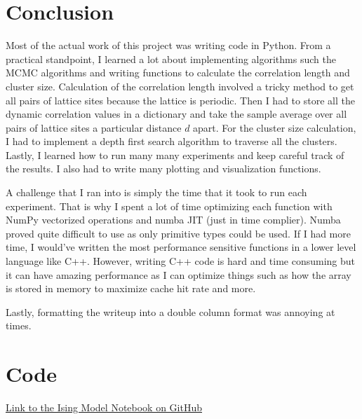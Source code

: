 \documentclass{article}
\begin{document}
\section{Conclusion}
Most of the actual work of this project was writing code in Python. From a practical standpoint, I learned a lot about implementing algorithms such
the MCMC algorithms and writing functions to calculate the correlation length and cluster size. Calculation of the correlation length involved a tricky
method to get all pairs of lattice sites because the lattice is periodic. Then I had to store all the dynamic correlation values in a dictionary and take the sample
average over all pairs of lattice sites a particular distance $d$ apart. For the cluster size calculation, I had to implement a depth first search algorithm
to traverse all the clusters. Lastly, I learned how to run many many experiments and keep careful track of the results. I also had to write many plotting 
and visualization functions. 

A challenge that I ran into is simply the time that it took to run each experiment. That is why I spent a lot of time optimizing each function with NumPy vectorized
operations and numba JIT (just in time complier). Numba proved quite difficult to use as only primitive types could be used. If I had more time, I would've written the most performance sensitive functions
in a lower level language like C++. However, writing C++ code is hard and time consuming but it can have amazing performance as I can optimize things such as how the array
is stored in memory to maximize cache hit rate and more.

Lastly, formatting the writeup into a double column format was annoying at times.

\section{Code}
\href{https://github.com/fysmoe1121/Phase-Transition-of-Error-Correcting-Codes/blob/main/ising_model.ipynb}{Link to the Ising Model Notebook on GitHub}




\end{document}
